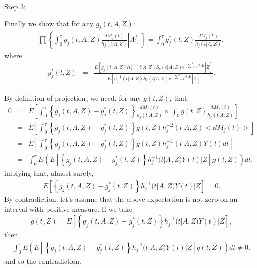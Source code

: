 \documentclass[11pt]{article}
\newcommand{\ee}{\end{eqnarray}}
\newcommand{\eqnn}{\begin{eqnarray*}}
\newcommand{\een}{\end{eqnarray*}}
\newcommand{\be}{\begin{eqnarray}}
\begin{document}
\underline{Step 3:}

Finally we show that 
for any $g_j(t,A,Z)$:
\eqnn
\prod\left\{\left.\int_0^\tau g_j(t,A,Z)\frac{dM_j(t)}{h_j(t | A,Z)} \right| \Lambda_{1s}^{j}\right\}=\int_0^\tau g^{*}_j(t,Z)\frac{dM_j(t)}{h_j(t | A,Z)},
\een
where
\eqnn
g^{*}_j(t, Z)&=&\frac{E\left[\left.g_j(t,A,Z)h_j^{-1}(t | A,Z)S_{c}(t | A,Z) e^{-\sum_{l=1}^J\beta_{l}At} \right| Z\right]}{E\left[\left.h_j^{-1}(t | A,Z)S_{c}(t | A,Z) e^{-\sum_{l=1}^J\beta_{l}At} \right| Z\right]}.
\een


By definition of projection, we need, for any $g(t, Z)$, that:
\eqnn
0&=&E\left[\int_0^\tau \left\{g_j(t,A,Z)-g^{*}_j(t,Z)\right\}\frac{dM_j(t)}{h_j(t | A,Z)}\times\int_0^\tau g(t,Z)\frac{dM_j(t)}{h_j(t | A,Z)}\right]\\
&=&E\left[\int_0^\tau \left\{g_j(t,A,Z)-g^{*}_j(t,Z)\right\}g(t,Z)h^{-2}_j(t | A,Z) <dM_j(t)>\right]\\
&=&E\left[\int_0^\tau\left\{g_j(t,A,Z)-g^{*}_j(t,Z)\right\}g(t,Z)h^{-1}_j(t | A,Z) Y(t)dt\right]\\
&=&\int_0^\tau E\left(E\left[\left\{g_j(t,A,Z)-g^{*}_j(t,Z)\right\}h^{-1}_j(t | A,Z)Y(t) | Z\right]g(t,Z)\right)dt,
\een
implying that, almost surely,
\eqnn
E\left[\left\{g_j(t,A,Z)-g^{*}_j(t,Z)\right\}h^{-1}_j(t | A,Z)Y(t) | Z\right]=0.
\een
By contradiction, let's assume that the above expectation is not zero on an interval with positive measure. If we take 
\eqnn g(t,Z)=E\left[\left\{g_j(t,A,Z)-g^{*}_j(t,Z)\right\}h^{-1}_j(t | A,Z)Y(t) | Z\right],\een
then 
\eqnn \int_0^\tau E\left(E\left[\left\{g_j(t,A,Z)-g^{*}_j(t,Z)\right\}h^{-1}_j(t | A,Z)Y(t) | Z\right]g(t,Z)\right)dt\neq0. \een
 and so the contradiction.
\end{document}
